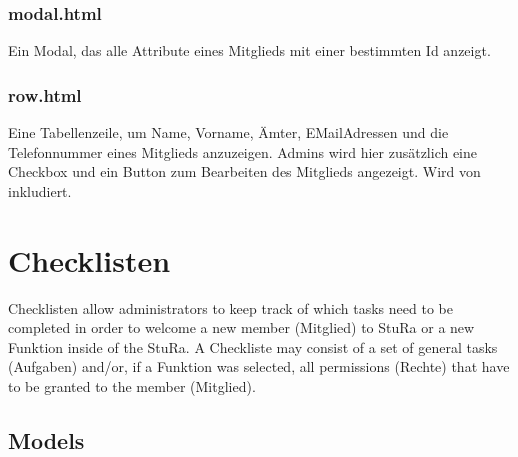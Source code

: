 \documentclass[letterpaper,10pt,english]{sphinxmanual}
\begin{document}
\subsubsection{modal.html}
\label{\detokenize{masterCodeDoc:modal-html}}
Ein Modal, das alle Attribute eines Mitglieds mit einer bestimmten Id anzeigt.


\subsubsection{row.html}
\label{\detokenize{masterCodeDoc:id8}}
Eine Tabellenzeile, um Name, Vorname, Ämter, E\sphinxhyphen{}Mail\sphinxhyphen{}Adressen und die Telefonnummer eines Mitglieds anzuzeigen. Admins wird hier zusätzlich eine Checkbox und ein Button zum Bearbeiten des Mitglieds angezeigt.
Wird von  inkludiert.


\section{Checklisten}
\label{\detokenize{masterCodeDoc:checklisten}}
Checklisten allow administrators to keep track of which tasks need to be completed in order to welcome a new member (Mitglied) to StuRa or a new Funktion inside of the StuRa.
A Checkliste may consist of a set of general tasks (Aufgaben) and/or, if a Funktion was selected, all permissions (Rechte) that have to be granted to the member (Mitglied).


\subsection{Models}
\label{\detokenize{masterCodeDoc:id9}}\label{\detokenize{masterCodeDoc:module-checklisten.models}}
\end{document}
